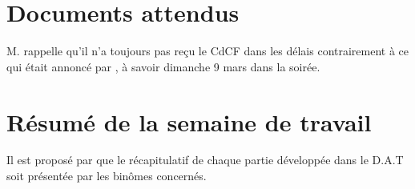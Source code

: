 \documentclass[11pt,fleqn]{report}
\begin{document}
\section{Documents attendus}

M. \Agopian rappelle qu'il n'a toujours pas reçu le CdCF dans les délais contrairement à ce qui était annoncé par \amo, à savoir dimanche 9 mars dans la soirée.

\section{Résumé de la semaine de travail}

Il est proposé par \amo que le récapitulatif de chaque partie développée dans le D.A.T soit présentée par les binômes concernés.

\subsection{}








\end{document}
